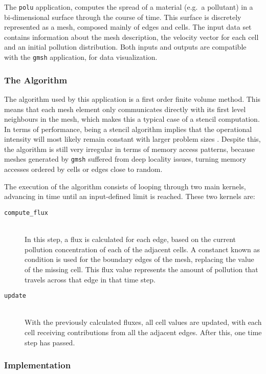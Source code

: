 \documentclass[main.tex]{subfiles}
\begin{document}
The \texttt{polu} application, computes the spread of a material (e.g.\ a pollutant) in a bi-dimensional surface through the course of time. This surface is discretely represented as a mesh, composed mainly of edges and cells. The input data set contains information about the mesh description, the velocity vector for each cell and an initial pollution distribution.
Both inputs and outputs are compatible with the \texttt{gmsh} application, for data visualization.

\subsubsection{The Algorithm}

The algorithm used by this application is a first order finite volume method. This means that each mesh element only communicates directly with its first level neighbours in the mesh, which makes this a typical case of a stencil computation. In terms of performance, being a stencil algorithm implies that the operational intensity will most likely remain constant with larger problem sizes \cite{williams2009roofline,williams2010roofline}. Despite this, the algorithm is still very irregular in terms of memory access patterns, because meshes generated by \texttt{gmsh} suffered from deep locality issues, turning memory accesses ordered by cells or edges close to random.

The execution of the algorithm consists of looping through two main kernels, advancing in time until an input-defined limit is reached. These two kernels are:
\begin{description}
\item[\texttt{compute\_flux}] \hfill \\
  In this step, a flux is calculated for each edge, based on the current pollution concentration of each of the adjacent cells. A constanct known as  condition is used for the boundary edges of the mesh, replacing the value of the missing cell. This flux value represents the amount of pollution that travels across that edge in that time step.

\item[\texttt{update}] \hfill \\
  With the previously calculated fluxes, all cell values are updated, with each cell receiving contributions from all the adjacent edges. After this, one time step has passed.
\end{description}

\subsubsection{Implementation}
\end{document}
